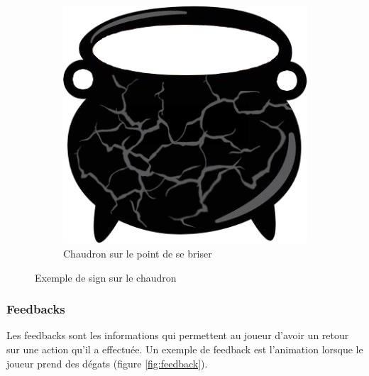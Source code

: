 \begin{figure}[h]
\begin{subfigure}[t]{0.45\textwidth}
            \includegraphics[width=\textwidth]{image/chaudron/chaudron3.png}
            \caption{Chaudron sur le point de se briser}
        \end{subfigure}
        \caption{Exemple de sign sur le chaudron}
        \label{fig:sign}
    \end{figure}


\subsubsection{Feedbacks}
    Les feedbacks sont les informations qui permettent au joueur d'avoir un retour sur une action qu'il a effectuée. Un exemple de feedback est l'animation lorsque le joueur prend des dégats (figure \ref{fig:feedback}). 
    
